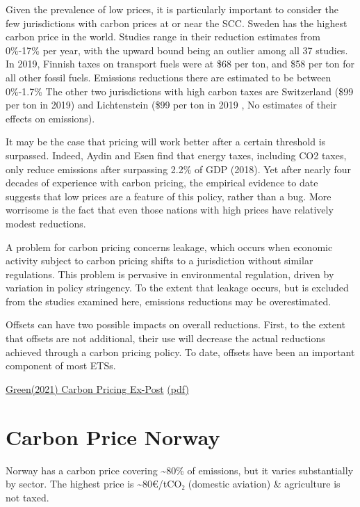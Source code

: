 \documentclass[
]{book}
\begin{document}
Given the prevalence of low prices, it is particularly important to consider the few jurisdictions
with carbon prices at or near the SCC.
Sweden has the highest carbon price in the world.
Studies range in their reduction estimates from 0\%-17\% per year, with the upward
bound being an outlier among all 37 studies.
In 2019, Finnish taxes on transport fuels were at \$68 per ton, and \$58 per ton for
all other fossil fuels.
Emissions reductions there are estimated to be between 0\%-1.7\%
The other two jurisdictions with high carbon taxes are
Switzerland (\$99 per ton in 2019) and Lichtenstein (\$99 per ton in 2019
, No estimates of their effects on emissions).

It may be the case that pricing will work better after a certain threshold is surpassed. Indeed,
Aydin and Esen find that energy taxes, including CO2 taxes, only reduce emissions after
surpassing 2.2\% of GDP (2018). Yet after nearly four decades of experience with carbon pricing,
the empirical evidence to date suggests that low prices are a feature of this policy, rather than a
bug. More worrisome is the fact that even those nations with high prices have relatively
modest reductions.

A problem for carbon pricing concerns leakage, which occurs when economic
activity subject to carbon pricing shifts to a jurisdiction without similar regulations. This
problem is pervasive in environmental regulation, driven by variation in policy stringency.
To the extent that leakage occurs, but is excluded from the studies examined here, emissions
reductions may be overestimated.

Offsets can have two possible impacts on overall reductions. First, to the extent that offsets are
not additional, their use will decrease the actual reductions achieved through a carbon pricing
policy.
To date, offsets have been an important component of most ETSs.

\href{https://iopscience.iop.org/article/10.1088/1748-9326/abdae9/meta}{Green(2021) Carbon Pricing Ex-Post}
\href{pdf/Green_2021_Carbon_Pricing_Ex-Post.pdf}{(pdf)}

\hypertarget{carbon-price-norway}{%
\section{Carbon Price Norway}\label{carbon-price-norway}}

Norway has a carbon price covering \textasciitilde80\% of emissions, but it varies substantially by sector. The highest price is \textasciitilde80€/tCO₂ (domestic aviation) \& agriculture is not taxed.
\end{document}
